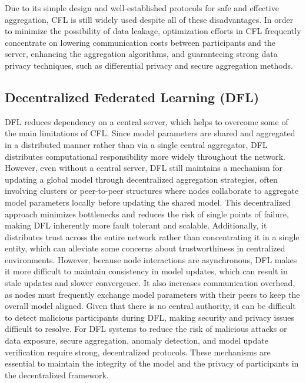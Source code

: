 Due to its simple design and well-established protocols for safe and effective aggregation, \gls{CFL} is still widely used despite all of these disadvantages. In order to minimize the possibility of data leakage, optimization efforts in \gls{CFL} frequently concentrate on lowering communication costs between participants and the server, enhancing the aggregation algorithms, and guaranteeing strong data privacy techniques, such as differential privacy and secure aggregation methods.

\subsection{Decentralized Federated Learning (DFL)}
\label{sub:decentralized_federated_learning_1}

\gls{DFL} reduces dependency on a central server, which helps to overcome some of the main limitations of CFL. Since model parameters are shared and aggregated in a distributed manner rather than via a single central aggregator, DFL distributes computational responsibility more widely throughout the network.
However, even without a central server, \gls{DFL} still maintains a mechanism for updating a global model through decentralized aggregation strategies, often involving clusters or peer-to-peer structures where nodes collaborate to aggregate model parameters locally before updating the shared model.
This decentralized approach minimizes bottlenecks and reduces the risk of single points of failure, making DFL inherently more fault tolerant and scalable. Additionally, it distributes trust across the entire network rather than concentrating it in a single entity, which can alleviate some concerns about trustworthiness in centralized environments. However, because node interactions are asynchronous, DFL makes it more difficult to maintain consistency in model updates, which can result in stale updates and slower convergence. It also increases communication overhead, as nodes must frequently exchange model parameters with their peers to keep the overall model aligned.
Given that there is no central authority, it can be difficult to detect malicious participants during DFL, making security and privacy issues difficult to resolve. For \gls{DFL} systems to reduce the risk of malicious attacks or data exposure, secure aggregation, anomaly detection, and model update verification require strong, decentralized protocols. These mechanisms are essential to maintain the integrity of the model and the privacy of participants in the decentralized framework. 


